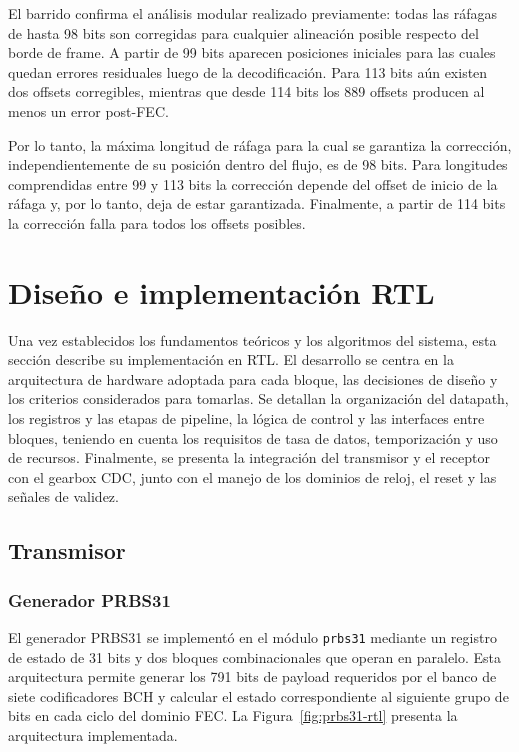 \documentclass[10pt,a4paper]{article}
\begin{document}
El barrido confirma el análisis modular realizado previamente: todas las
ráfagas de hasta 98 bits son corregidas para cualquier alineación posible
respecto del borde de frame. A partir de 99 bits aparecen posiciones iniciales
para las cuales quedan errores residuales luego de la decodificación. Para
113 bits aún existen dos offsets corregibles, mientras que desde 114 bits los
889 offsets producen al menos un error post-FEC.

Por lo tanto, la máxima longitud de ráfaga para la cual se garantiza la
corrección, independientemente de su posición dentro del flujo, es de 98 bits.
Para longitudes comprendidas entre 99 y 113 bits la corrección depende del
offset de inicio de la ráfaga y, por lo tanto, deja de estar garantizada.
Finalmente, a partir de 114 bits la corrección falla para todos los offsets
posibles.

\section{Diseño e implementación RTL}
Una vez establecidos los fundamentos teóricos y los algoritmos del sistema,
esta sección describe su implementación en RTL. El desarrollo se centra en
la arquitectura de hardware adoptada para cada bloque, las decisiones de
diseño y los criterios considerados para tomarlas. Se detallan la organización
del datapath, los registros y las etapas de pipeline, la lógica de control y
las interfaces entre bloques, teniendo en cuenta los requisitos de tasa de
datos, temporización y uso de recursos. Finalmente, se presenta la integración
del transmisor y el receptor con el gearbox CDC, junto con el manejo de los
dominios de reloj, el reset y las señales de validez.

\subsection{Transmisor}

\subsubsection{Generador PRBS31}

El generador PRBS31 se implementó en el módulo \texttt{prbs31} mediante un
registro de estado de 31 bits y dos bloques combinacionales que operan en
paralelo. Esta arquitectura permite generar los 791 bits de payload
requeridos por el banco de siete codificadores BCH y calcular el estado
correspondiente al siguiente grupo de bits en cada ciclo del dominio FEC.
La Figura~\ref{fig:prbs31-rtl} presenta la arquitectura implementada.
\end{document}
